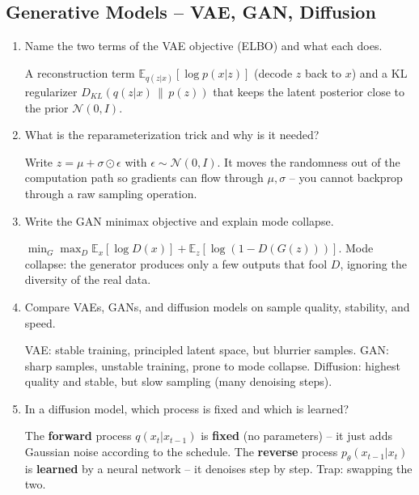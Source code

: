 \documentclass[10pt,a4paper]{article}
\newcommand{\q}[1]{\item #1}
\begin{document}
\subsection{Generative Models -- VAE, GAN, Diffusion}

\begin{enumerate}[leftmargin=*,label=\textbf{Q\arabic*.}]

\q Name the two terms of the VAE objective (ELBO) and what each does.
\begin{answerbox}
A reconstruction term $\mathbb{E}_{q(z|x)}[\log p(x|z)]$ (decode $z$ back to $x$) and a KL regularizer $D_{KL}(q(z|x)\,\|\,p(z))$ that keeps the latent posterior close to the prior $\mathcal{N}(0,I)$.
\end{answerbox}

\q What is the reparameterization trick and why is it needed?
\begin{answerbox}
Write $z=\mu+\sigma\odot\epsilon$ with $\epsilon\sim\mathcal{N}(0,I)$. It moves the randomness out of the computation path so gradients can flow through $\mu,\sigma$ -- you cannot backprop through a raw sampling operation.
\end{answerbox}

\q Write the GAN minimax objective and explain mode collapse.
\begin{answerbox}
$\min_G\max_D \mathbb{E}_x[\log D(x)] + \mathbb{E}_z[\log(1-D(G(z)))]$. Mode collapse: the generator produces only a few outputs that fool $D$, ignoring the diversity of the real data.
\end{answerbox}

\q Compare VAEs, GANs, and diffusion models on sample quality, stability, and speed.
\begin{answerbox}
VAE: stable training, principled latent space, but blurrier samples. GAN: sharp samples, unstable training, prone to mode collapse. Diffusion: highest quality and stable, but slow sampling (many denoising steps).
\end{answerbox}

\q In a diffusion model, which process is fixed and which is learned?
\begin{answerbox}
The \textbf{forward} process $q(x_t|x_{t-1})$ is \textbf{fixed} (no parameters) -- it just adds Gaussian noise according to the schedule. The \textbf{reverse} process $p_\theta(x_{t-1}|x_t)$ is \textbf{learned} by a neural network -- it denoises step by step. Trap: swapping the two.
\end{answerbox}


\end{enumerate}
\end{document}
